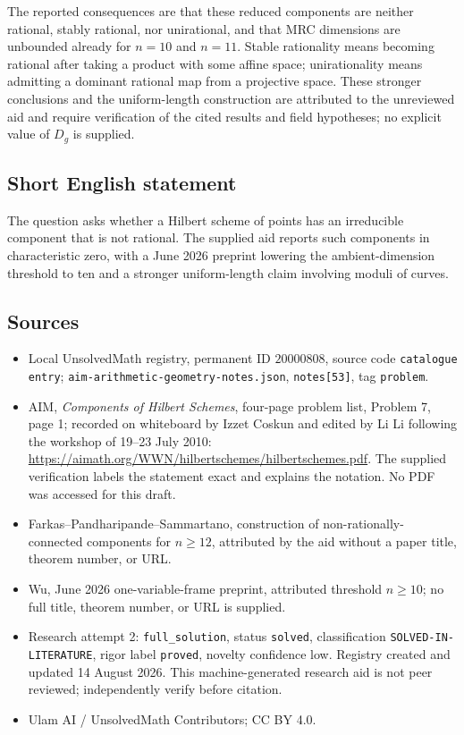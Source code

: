 \documentclass[11pt]{article}
\begin{document}
The reported consequences are that these reduced components are neither rational, stably rational, nor unirational, and that MRC dimensions are unbounded already for \(n=10\) and \(n=11\). Stable rationality means becoming rational after taking a product with some affine space; unirationality means admitting a dominant rational map from a projective space. These stronger conclusions and the uniform-length construction are attributed to the unreviewed aid and require verification of the cited results and field hypotheses; no explicit value of \(D_g\) is supplied.
\subsection{Short English statement}
The question asks whether a Hilbert scheme of points has an irreducible component that is not rational. The supplied aid reports such components in characteristic zero, with a June 2026 preprint lowering the ambient-dimension threshold to ten and a stronger uniform-length claim involving moduli of curves.
\subsection{Sources}
\begin{itemize}
\item Local UnsolvedMath registry, permanent ID \(20000808\), source code \texttt{catalogue entry}; \texttt{aim-arithmetic-geometry-notes.json}, \texttt{notes[53]}, tag \texttt{problem}.
\item AIM, \emph{Components of Hilbert Schemes}, four-page problem list, Problem 7, page 1; recorded on whiteboard by Izzet Coskun and edited by Li Li following the workshop of 19--23 July 2010: \url{https://aimath.org/WWN/hilbertschemes/hilbertschemes.pdf}. The supplied verification labels the statement exact and explains the notation. No PDF was accessed for this draft.
\item Farkas--Pandharipande--Sammartano, construction of non-rationally-connected components for \(n\ge12\), attributed by the aid without a paper title, theorem number, or URL.
\item Wu, June 2026 one-variable-frame preprint, attributed threshold \(n\ge10\); no full title, theorem number, or URL is supplied.
\item Research attempt 2: \texttt{full\_solution}, status \texttt{solved}, classification \texttt{SOLVED-IN-LITERATURE}, rigor label \texttt{proved}, novelty confidence low. Registry created and updated 14 August 2026. This machine-generated research aid is not peer reviewed; independently verify before citation.
\item Ulam AI / UnsolvedMath Contributors; CC BY 4.0.
\end{itemize}
\end{document}
